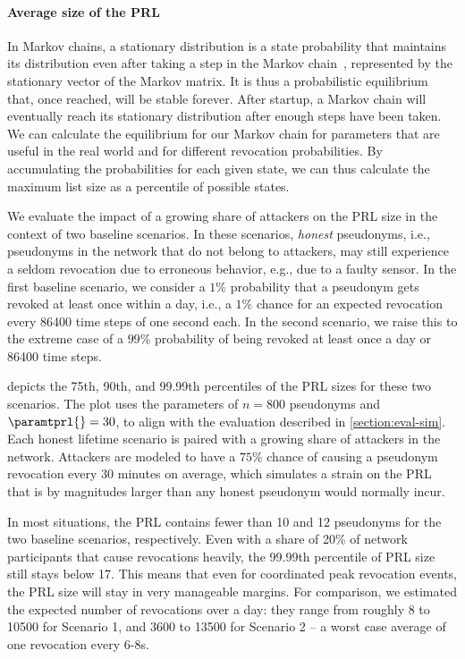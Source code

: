\paragraph{Average size of the PRL}
%
In Markov chains, a stationary distribution is a state probability that
maintains its distribution even after taking a step in the Markov
chain~\cite{hermanns2002markov}, represented by the stationary vector of the
Markov matrix. It is thus a probabilistic equilibrium that, once reached, will
be stable forever.  After startup, a Markov chain will eventually reach its
stationary distribution after enough steps have been taken.  We can calculate
the equilibrium for our Markov chain for parameters that are useful in the real
world and for different revocation probabilities. By accumulating the
probabilities for each given state, we can thus calculate the maximum list size
as a percentile of possible states.

We evaluate the impact of a growing share of attackers on the PRL size in
the context of two baseline scenarios. In these scenarios,
\textit{honest} pseudonyms, i.e., pseudonyms in the network that do not belong
to attackers, may still experience a seldom revocation due to erroneous
behavior, e.g., due to a faulty sensor. In the first baseline scenario, we
consider a $1\%$ probability that a pseudonym gets revoked at least once within
a day, i.e., a $1\%$ chance for an expected revocation every 86400 time steps of
one second each. In the second scenario, we raise this to the extreme case of a
$99\%$ probability of being revoked at least once a day or 86400 time steps.

 depicts the 75th, 90th, and 99.99th percentiles of the
\ac{PRL} sizes for these two scenarios.  The plot uses the parameters of $n=800$
pseudonyms and $\paramtprl{}=30$, to align with the evaluation described in
\cref{section:eval-sim}.  Each honest lifetime scenario is paired with a growing
share of attackers in the network. Attackers are modeled to
have a $75\%$ chance of causing a pseudonym revocation every 30 minutes on
average, which simulates a strain on the \ac{PRL} that is by magnitudes larger
than any honest pseudonym would normally incur.

In most situations, the \ac{PRL} contains fewer than 10 and 12
pseudonyms for the two baseline scenarios, respectively. Even
with a share of 20\% of network participants that cause revocations heavily, the
99.99th percentile of \ac{PRL} size still stays below 17. This means that
even for coordinated peak revocation events, the \ac{PRL} size
will stay in very manageable margins. For comparison, we estimated the expected
number of revocations over a day: they range from roughly 8 to 10500 for Scenario
1, and 3600 to 13500 for Scenario 2 -- a worst case average of one revocation
every 6-8s.

